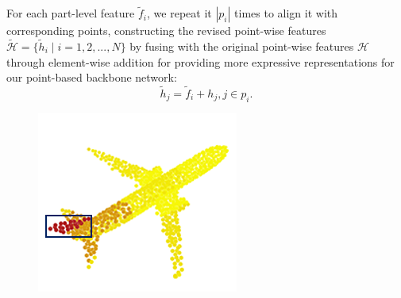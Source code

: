 \documentclass[letterpaper]{article} %
\begin{document}
For each part-level feature \(\tilde{f}_i\), we repeat it \(|p_i|\) times to align it with corresponding points, constructing the revised point-wise features \( \tilde{\mathcal{H}} = \{\tilde{h}_i \mid i=1,2,...,N \}\) by fusing with the original point-wise features \(\mathcal{H}\) through element-wise addition for providing more expressive representations for our point-based backbone network:
\begin{equation}
    \tilde{h}_j = \tilde{f}_i + h_j , j \in p_i.
\end{equation}


\begin{figure}[htbp]
\begin{center}
\begin{minipage}[b]{0.8\linewidth}
\begin{center}
\begin{minipage}[b]{0.15\linewidth}
\begin{center}
\end{center}
\end{minipage}
\begin{minipage}[b]{0.12\linewidth}
\begin{center}
\includegraphics[width=1.0\linewidth]{images/atten_pic/airplane_attention_1.png}
\end{center}
\end{minipage}
\begin{minipage}[b]{0.12\linewidth}

\end{minipage}
\end{center}
\end{minipage}
\end{center}
\end{figure}
\end{document}
